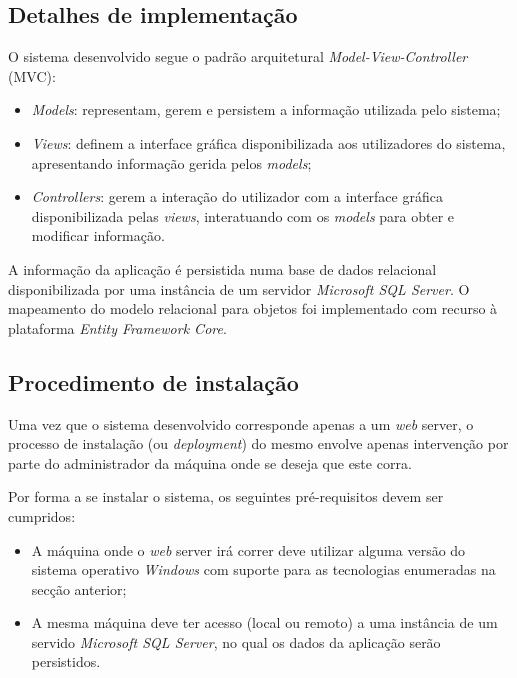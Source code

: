 
\subsection{Detalhes de implementação}
\label{sec:construcao:implementacao}

O sistema desenvolvido segue o padrão arquitetural \emph{Model-View-Controller} (MVC):

\begin{itemize}

    \item \emph{Models}: representam, gerem e persistem a informação utilizada pelo sistema;
    
    \item \emph{Views}: definem a interface gráfica disponibilizada aos utilizadores do sistema, apresentando informação gerida pelos \emph{models};
    
    \item \emph{Controllers}: gerem a interação do utilizador com a interface gráfica disponibilizada pelas \emph{views}, interatuando com os \emph{models} para obter e modificar informação.
    
\end{itemize}

A informação da aplicação é persistida numa base de dados relacional disponibilizada por uma instância de um servidor \emph{Microsoft SQL Server}. O mapeamento do modelo relacional para objetos foi implementado com recurso à plataforma \emph{Entity Framework Core}.


\subsection{Procedimento de instalação}
\label{sec:construcao:instalacao}

Uma vez que o sistema desenvolvido corresponde apenas a um \emph{web} server, o processo de instalação (ou \emph{deployment}) do mesmo envolve apenas intervenção por parte do administrador da máquina onde se deseja que este corra.

Por forma a se instalar o sistema, os seguintes pré-requisitos devem ser cumpridos:

\begin{itemize}

    \item A máquina onde o \emph{web} server irá correr deve utilizar alguma versão do sistema operativo \emph{Windows} com suporte para as tecnologias enumeradas na secção anterior;
    
    \item A mesma máquina deve ter acesso (local ou remoto) a uma instância de um servido \emph{Microsoft SQL Server}, no qual os dados da aplicação serão persistidos.
    
\end{itemize}

